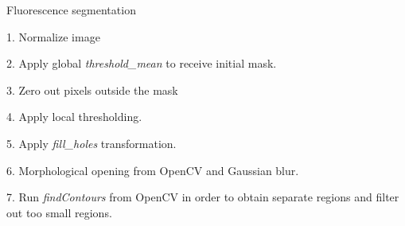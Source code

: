 

\begin{algorithm}
    \caption{Fluorescence segmentation}\label{alg:global-thresholding}
    \begin{algorithmic}
    \item 1. Normalize image
    \item 2. Apply global \textit{threshold\_mean} to receive initial mask.
    \item 3. Zero out pixels outside the mask
    \item 4. Apply local thresholding.  
    \item 5. Apply \textit{fill\_holes} transformation.
    \item 6. Morphological opening from OpenCV and Gaussian blur.
    \item 7. Run \textit{findContours} from OpenCV in order to obtain separate regions and filter out too small regions.
    \end{algorithmic}
\end{algorithm}    

